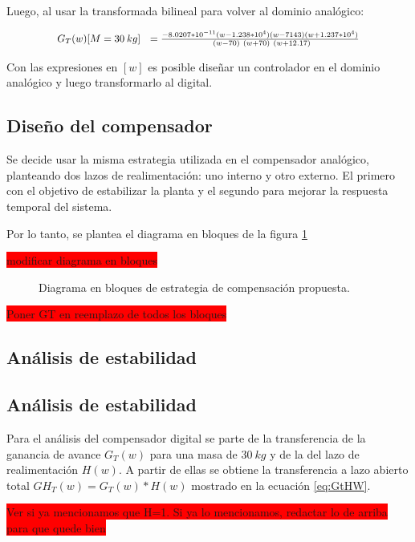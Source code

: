 \noindent Luego, al usar la transformada bilineal para volver al dominio anal\'{o}gico:

\begin{equation}
	\resizebox{.8\hsize}{!}
	{
		$G_T(w)[M=30\:kg]\ \ =\frac{-8.0207*10^{-11}(w-1.238*10^4)(w-7143)(w+1.237*10^4)}{\ (w-70)\ (w+70)\ (w+12.17)}$
	}
\end{equation}


\noindent Con las expresiones en $[w]$ es posible diseñar un controlador en el dominio analógico y luego transformarlo al digital.

\subsection{Diseño del compensador}

Se decide usar la misma estrategia utilizada en el compensador analógico, planteando dos lazos de realimentación: uno interno y otro externo. El primero con el objetivo de estabilizar la planta y el segundo para mejorar la respuesta temporal del sistema.  

Por lo tanto, se plantea el diagrama en bloques de la figura \ref{fig:diag-en-bloques-comp_digital}

\colorbox{red}{modificar diagrama en bloques}
\begin{figure}[H]
	\centering
	\scalebox{0.8}{}
	\caption{Diagrama en bloques de estrategia de compensación propuesta.}	\label{fig:diag-en-bloques-comp_digital}
\end{figure}
\colorbox{red}{Poner GT en reemplazo de todos los bloques}

\subsection{Análisis de estabilidad}

\subsection{Análisis de estabilidad}

\noindent Para el análisis del compensador digital se parte de la transferencia de la ganancia de avance $G_{T}(w)$ para una masa de $30\:kg$ y de la del lazo de realimentación $H(w)$. A partir de ellas se obtiene la transferencia a lazo abierto total $GH_{T}(w)=G_{T}(w)*H(w)$ mostrado en la ecuación \ref{eq:GtHW}.

\colorbox{red}{Ver si ya mencionamos que H=1. Si ya lo mencionamos, redactar lo de arriba para que quede bien}
 

